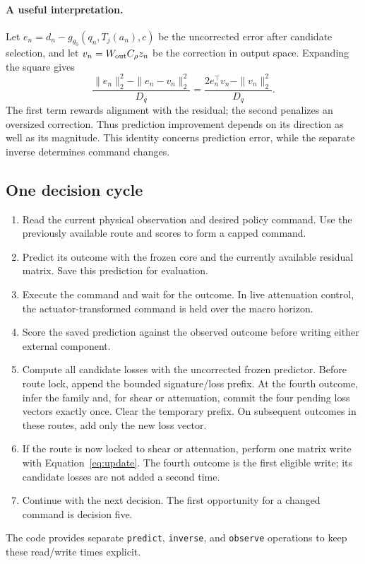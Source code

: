 \paragraph{A useful interpretation.}
Let $e_n=d_n-g_{\theta_0}(q_n,T_j(a_n),c)$ be the uncorrected error after
candidate selection, and let $v_n=W_{\rm out}C_\rho z_n$ be the correction in
output space. Expanding the square gives
\begin{equation}
 \frac{\|e_n\|_2^2-\|e_n-v_n\|_2^2}{D_q}
 =\frac{2e_n^\top v_n-\|v_n\|_2^2}{D_q}.
\end{equation}
The first term rewards alignment with the residual; the second penalizes an
oversized correction. Thus prediction improvement depends on its direction
as well as its magnitude. This identity concerns prediction error, while
the separate inverse determines command changes.

\subsection{One decision cycle}
\begin{enumerate}[leftmargin=*,itemsep=3pt]
\item Read the current physical observation and desired policy command.
      Use the previously available route and scores to form a capped command.
\item Predict its outcome with the frozen core and the currently available
      residual matrix. Save this prediction for evaluation.
\item Execute the command and wait for the outcome. In live attenuation
      control, the actuator-transformed command is held over the macro horizon.
\item Score the saved prediction against the observed outcome before writing
      either external component.
\item Compute all candidate losses with the uncorrected frozen predictor.
      Before route lock, append the bounded signature/loss prefix. At the
      fourth outcome, infer the family and, for shear or attenuation, commit
      the four pending loss vectors exactly once. Clear the temporary prefix.
      On subsequent outcomes in these routes, add only the new loss vector.
\item If the route is now locked to shear or attenuation, perform one matrix
      write with Equation~\eqref{eq:update}. The fourth outcome is the first
      eligible write; its candidate losses are not added a second time.
\item Continue with the next decision. The first opportunity for a changed
      command is decision five.
\end{enumerate}
The code provides separate \texttt{predict}, \texttt{inverse}, and
\texttt{observe} operations to keep these read/write times explicit.

